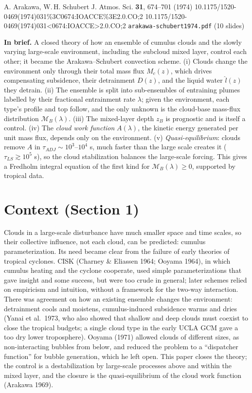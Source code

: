 \documentclass[10pt,a4paper]{article}
\newcommand{\MB}{\mathcal M_B}
\begin{document}
{A. Arakawa, W.\,H. Schubert}
{J. Atmos. Sci. \textbf{31}, 674--701 (1974)}
{10.1175/1520-0469(1974)031\%3C0674:IOACCE\%3E2.0.CO;2}
{10.1175/1520-0469(1974)031<0674:IOACCE>2.0.CO;2}
{\texttt{arakawa-schubert1974.pdf} (10 slides)}

\begin{summarybox}
\textbf{In brief.} A closed theory of how an ensemble of cumulus clouds and the slowly varying large-scale environment, including the subcloud mixed layer, control each other; it became the Arakawa--Schubert convection scheme. (i) Clouds change the environment only through their total mass flux $M_c(z)$, which drives compensating subsidence, their detrainment $D(z)$, and the liquid water $\hat l(z)$ they detrain. (ii) The ensemble is split into sub-ensembles of entraining plumes labelled by their fractional entrainment rate $\lambda$; given the environment, each type's profile and top follow, and the only unknown is the cloud-base mass-flux distribution $\MB(\lambda)$. (iii) The mixed-layer depth $z_B$ is prognostic and is itself a control. (iv) The \emph{cloud work function} $A(\lambda)$, the kinetic energy generated per unit mass flux, depends only on the environment. (v) \emph{Quasi-equilibrium}: clouds remove $A$ in $\tau_{ADJ}\sim10^3$--$10^4$ s, much faster than the large scale creates it ($\tau_{LS}\gtrsim10^5$ s), so the cloud stabilization balances the large-scale forcing. This gives a Fredholm integral equation of the first kind for $\MB(\lambda)\geq0$, supported by tropical data.
\end{summarybox}

\section{Context (Section 1)}
Clouds in a large-scale disturbance have much smaller space and time scales, so their collective influence, not each cloud, can be predicted: cumulus parameterization. Its need became clear from the failure of early theories of tropical cyclones. CISK (Charney \& Eliassen 1964; Ooyama 1964), in which cumulus heating and the cyclone cooperate, used simple parameterizations that gave insight and some success, but were too crude in general; later schemes relied on empiricism and intuition, without a framework for the two-way interaction. There was agreement on how an existing ensemble changes the environment: detrainment cools and moistens, cumulus-induced subsidence warms and dries (Yanai et al.\ 1973, who also showed that shallow and deep clouds must coexist to close the tropical budgets; a single cloud type in the early UCLA GCM gave a too dry lower troposphere). Ooyama (1971) allowed clouds of different sizes, as non-interacting bubbles from below, and reduced the problem to a ``dispatcher function'' for bubble generation, which he left open. This paper closes the theory; the control is a destabilization by large-scale processes above and within the mixed layer, and the closure is the quasi-equilibrium of the cloud work function (Arakawa 1969).
\end{document}
